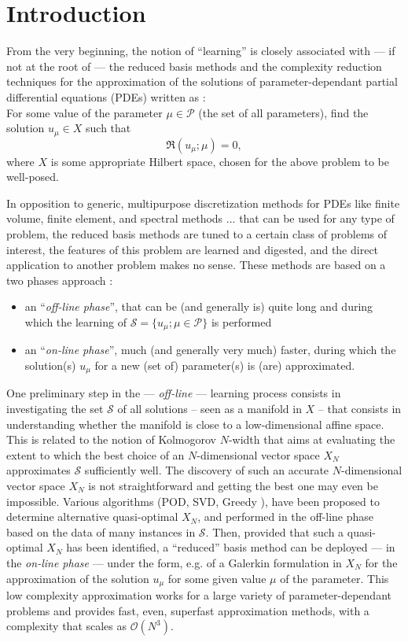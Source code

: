 \documentclass[graybox]{svmult}
\begin{document}
\section{Introduction}
\label{sec:Intro}
From the very beginning,
the notion of ``learning'' is closely associated with --- if not at the root of ---  the reduced basis methods and  the complexity reduction techniques for the approximation of the solutions of parameter-dependant partial differential equations (PDEs) written as : 
\\
For some value of the parameter $\mu \in {\mathcal P}$ (the set of all parameters), find the solution $u_\mu\in X$ such that 
\begin{equation}\label{eq1}
    {\mathfrak R}(u_\mu;\mu)=0,
\end{equation} where $X$ is some appropriate Hilbert space, chosen for the above problem to be well-posed. 

In opposition to generic, multipurpose discretization methods for PDEs like finite volume, finite element, and spectral methods ... that can be used for any type of problem, the reduced basis methods are tuned to a certain class of problems of interest, the features of this problem are learned and digested, and the direct application to another problem makes no sense. These methods are based on a two phases approach : 
\begin{itemize}
    \item an ``{\sl off-line phase}'', that can be (and generally is) quite long and during which the learning of ${\mathcal S} =\{ u_\mu; \mu\in{\mathcal P}\}$ is performed
    \item an ``{\sl on-line phase}'', much (and generally very much) faster, during which the solution(s) $u_\mu$ for a new (set of) parameter(s) is (are) approximated.
\end{itemize}

One preliminary step in the --- {\sl off-line} --- learning process consists in investigating the set ${\mathcal S}$ of all solutions -- seen as a manifold in $X$ -- that consists in understanding whether the manifold is close to a low-dimensional affine space. This is related to the notion of Kolmogorov $N$-width that aims at evaluating the extent to which the best choice of an $N$-dimensional vector space $X_N$ approximates ${\mathcal S}$ sufficiently well. The discovery of 
such an accurate $N$-dimensional vector space $X_N$ is not straightforward and getting the best one may even be impossible. Various algorithms (POD, SVD, Greedy \cite{bookRb, bookCrb}),  have been proposed to determine alternative quasi-optimal $X_N$, and performed in the off-line phase based on the data of many instances in ${\mathcal S}$.
Then, provided that  such a quasi-optimal $X_N$ has been identified,  a ``reduced'' basis method can be deployed --- in the {\sl on-line phase} ---  under the form, e.g. of
a Galerkin formulation in $X_N$ for the approximation of the solution $u_\mu$ for some given value $\mu$ of the parameter. This low complexity approximation works for a large variety of parameter-dependant problems and provides fast, even, superfast approximation methods, with a complexity that scales as ${\mathcal O}(N^3)$. 
\end{document}
